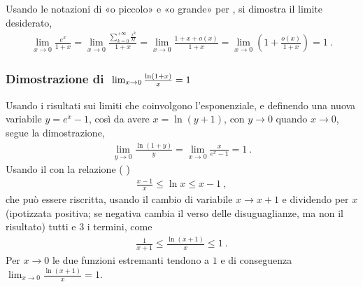 \documentclass[letterpaper,10pt,italian]{jupyterBook}
\begin{document}
\sphinxAtStartPar
Usando le notazioni di «o piccolo» e «o grande» per {\hyperref[\detokenize{ch/infinitesimal_calculus/analysis:infinitesimal-calculus-limits-infinite-simal}]{}}, si dimostra il limite desiderato,
\begin{equation*}
\begin{split}\lim_{x \rightarrow 0} \frac{e^x}{1 + x} = \lim_{x \rightarrow 0} \frac{\sum_{k=0}^{+\infty} \frac{x^k}{k!}}{1+x} = \lim_{x \rightarrow 0} \frac{1 + x + o(x)}{1+x} = \lim_{x \rightarrow 0} \left( 1 + \frac{o(x)}{1+x} \right) = 1 \ .\end{split}
\end{equation*}\subsubsection*{Dimostrazione di \protect\(\ \lim_{x \rightarrow 0} \frac{\ln (1+x)}{x} = 1\protect\)}

\sphinxAtStartPar
{} Usando i risultati sui limiti che coinvolgono l’esponenziale, e definendo una nuova variabile \(y = e^x - 1\), così da avere \(x = \ln (y+1)\), con \(y \rightarrow 0\) quando \(x \rightarrow 0\), segue la dimostrazione,
\begin{equation*}
\begin{split}\lim_{y \rightarrow 0} \frac{\ln(1+y)}{y} = \lim_{x \rightarrow 0} \frac{x}{e^x-1} = 1 \ .\end{split}
\end{equation*}
\sphinxAtStartPar
{} Usando il {\hyperref[\detokenize{ch/infinitesimal_calculus/analysis:infinitesimal-calculus-limits-thms-comparison}]{}} con la relazione ( )
\begin{equation*}
\begin{split}\frac{x-1}{x} \le \ln x \le x - 1 \ ,\end{split}
\end{equation*}
\sphinxAtStartPar
che può essere riscritta, usando il cambio di variabile \(x \rightarrow x+1\) e dividendo per \(x\) (ipotizzata positiva; se negativa cambia il verso delle disuguaglianze, ma non il risultato) tutti e 3 i termini, come
\begin{equation*}
\begin{split}\frac{1}{x+1} \le \frac{\ln (x + 1)}{x} \le 1 \ .\end{split}
\end{equation*}
\sphinxAtStartPar
Per \(x \rightarrow 0\) le due funzioni estremanti tendono a \(1\) e di conseguenza \(\lim_{x \rightarrow 0} \frac{\ln (x+1)}{x} = 1\).
\end{document}
